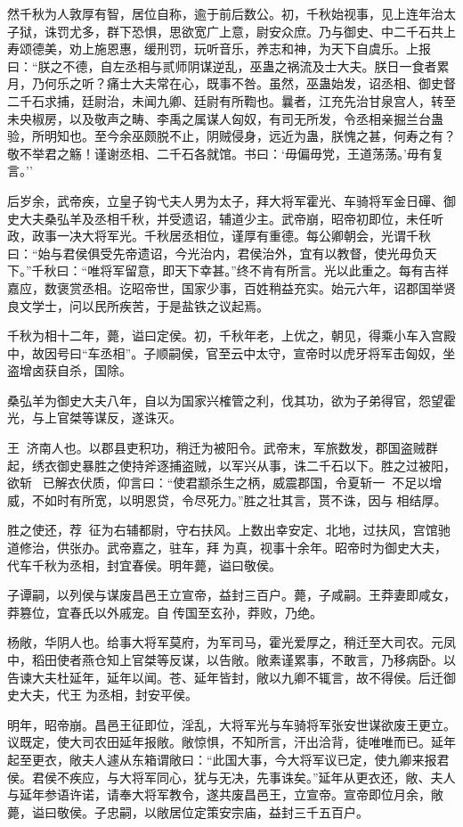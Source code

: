 \documentclass[]{article}
\begin{document}
然千秋为人敦厚有智，居位自称，逾于前后数公。初，千秋始视事，见上连年治太子狱，诛罚尤多，群下恐惧，思欲宽广上意，尉安众庶。乃与御史、中二千石共上寿颂德美，劝上施恩惠，缓刑罚，玩听音乐，养志和神，为天下自虞乐。上报曰：``朕之不德，自左丞相与贰师阴谋逆乱，巫蛊之祸流及士大夫。朕日一食者累月，乃何乐之听？痛士大夫常在心，既事不咎。虽然，巫蛊始发，诏丞相、御史督二千石求捕，廷尉治，未闻九卿、廷尉有所鞫也。曩者，江充先治甘泉宫人，转至未央椒房，以及敬声之畴、李禹之属谋人匈奴，有司无所发，令丞相亲掘兰台蛊验，所明知也。至今余巫颇脱不止，阴贼侵身，远近为蛊，朕愧之甚，何寿之有？敬不举君之觞！谨谢丞相、二千石各就馆。书曰：`毋偏毋党，王道荡荡。'毋有复言。''

后岁余，武帝疾，立皇子钩弋夫人男为太子，拜大将军霍光、车骑将军金日磾、御史大夫桑弘羊及丞相千秋，并受遗诏，辅道少主。武帝崩，昭帝初即位，未任听政，政事一决大将军光。千秋居丞相位，谨厚有重德。每公卿朝会，光谓千秋曰：``始与君侯俱受先帝遗诏，今光治内，君侯治外，宜有以教督，使光毋负天下。''千秋曰：``唯将军留意，即天下幸甚。''终不肯有所言。光以此重之。每有吉祥嘉应，数褒赏丞相。讫昭帝世，国家少事，百姓稍益充实。始元六年，诏郡国举贤良文学士，问以民所疾苦，于是盐铁之议起焉。

千秋为相十二年，薨，谥曰定侯。初，千秋年老，上优之，朝见，得乘小车入宫殿中，故因号曰``车丞相''。子顺嗣侯，官至云中太守，宣帝时以虎牙将军击匈奴，坐盗增卤获自杀，国除。

桑弘羊为御史大夫八年，自以为国家兴榷管之利，伐其功，欲为子弟得官，怨望霍光，与上官桀等谋反，遂诛灭。

王，济南人也。以郡县吏积功，稍迁为被阳令。武帝末，军旅数发，郡国盗贼群起，绣衣御史暴胜之使持斧逐捕盗贼，以军兴从事，诛二千石以下。胜之过被阳，欲斩，已解衣伏质，仰言曰：``使君颛杀生之柄，威震郡国，令夏斩一，不足以增威，不如时有所宽，以明恩贷，令尽死力。''胜之壮其言，贳不诛，因与相结厚。

胜之使还，荐，征为右辅都尉，守右扶风。上数出幸安定、北地，过扶风，宫馆驰道修治，供张办。武帝嘉之，驻车，拜为真，视事十余年。昭帝时为御史大夫，代车千秋为丞相，封宜春侯。明年薨，谥曰敬侯。

子谭嗣，以列侯与谋废昌邑王立宣帝，益封三百户。薨，子咸嗣。王莽妻即咸女，莽篡位，宜春氏以外戚宠。自传国至玄孙，莽败，乃绝。

杨敞，华阴人也。给事大将军莫府，为军司马，霍光爱厚之，稍迁至大司农。元凤中，稻田使者燕仓知上官桀等反谋，以告敞。敞素谨累事，不敢言，乃移病卧。以告谏大夫杜延年，延年以闻。苍、延年皆封，敞以九卿不辄言，故不得侯。后迁御史大夫，代王为丞相，封安平侯。

明年，昭帝崩。昌邑王征即位，淫乱，大将军光与车骑将军张安世谋欲废王更立。议既定，使大司农田延年报敞。敞惊惧，不知所言，汗出洽背，徒唯唯而已。延年起至更衣，敞夫人遽从东箱谓敞曰：``此国大事，今大将军议已定，使九卿来报君侯。君侯不疾应，与大将军同心，犹与无决，先事诛矣。''延年从更衣还，敞、夫人与延年参语许诺，请奉大将军教令，遂共废昌邑王，立宣帝。宣帝即位月余，敞薨，谥曰敬侯。子忠嗣，以敞居位定策安宗庙，益封三千五百户。
\end{document}
